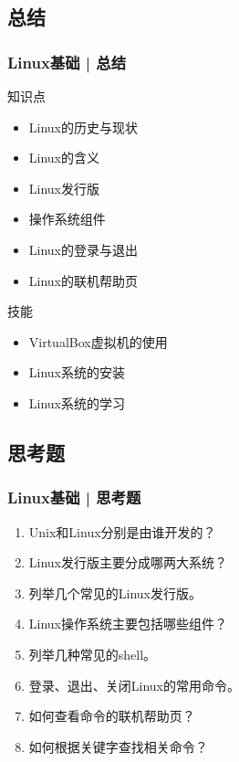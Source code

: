 \subsection{总结}
\begin{frame}
  \frametitle{Linux基础 | 总结}
  \begin{block}{知识点}
    \begin{itemize}
      \item Linux的历史与现状
      \item Linux的含义
      \item Linux发行版
      \item 操作系统组件
      \item Linux的登录与退出
      \item Linux的联机帮助页
    \end{itemize}
  \end{block}
  \begin{block}{技能}
    \begin{itemize}
      \item VirtualBox虚拟机的使用
      \item Linux系统的安装
      \item Linux系统的学习
    \end{itemize}
  \end{block}
\end{frame}

\subsection{思考题}
\begin{frame}
  \frametitle{Linux基础 | 思考题}
  \begin{enumerate}
    \item Unix和Linux分别是由谁开发的？
    \item Linux发行版主要分成哪两大系统？
    \item 列举几个常见的Linux发行版。
    \item Linux操作系统主要包括哪些组件？
    \item 列举几种常见的shell。
    \item 登录、退出、关闭Linux的常用命令。
    \item 如何查看命令的联机帮助页？
    \item 如何根据关键字查找相关命令？
  \end{enumerate}
\end{frame}

